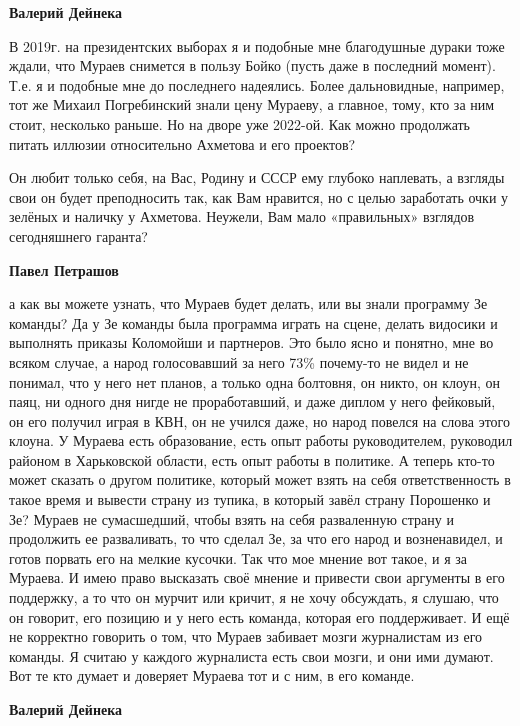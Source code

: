 \begin{itemize}
\begin{itemize}
\textbf{Валерий Дейнека} 

В 2019г. на президентских выборах я и подобные мне благодушные дураки тоже
ждали, что Мураев снимется в пользу Бойко (пусть даже в последний момент). Т.е.
я и подобные мне до последнего надеялись. Более дальновидные, например, тот же
Михаил Погребинский знали цену Мураеву, а главное, тому, кто за ним стоит,
несколько раньше. Но на дворе уже 2022-ой. Как можно продолжать питать иллюзии
относительно Ахметова и его проектов?


Он любит только себя, на Вас, Родину и СССР ему глубоко наплевать, а взгляды
свои он будет преподносить так, как Вам нравится, но с целью заработать очки у
зелёных и наличку у Ахметова. Неужели, Вам мало «правильных» взглядов
сегодняшнего гаранта?

\textbf{Павел Петрашов} 

а как вы можете узнать, что Мураев будет делать, или вы знали программу Зе
команды? Да у Зе команды была программа играть на сцене, делать видосики и
выполнять приказы Коломойши и партнеров. Это было ясно и понятно, мне во всяком
случае, а народ голосовавший за него 73\% почему-то не видел и не понимал, что
у него нет планов, а только одна болтовня, он никто, он клоун, он паяц, ни
одного дня нигде не проработавший, и даже диплом у него фейковый, он его
получил играя в КВН, он не учился даже, но народ повелся на слова этого клоуна.
У Мураева есть образование, есть опыт работы руководителем, руководил районом в
Харьковской области, есть опыт работы в политике. А теперь кто-то может сказать
о другом политике, который может взять на себя ответственность в такое время и
вывести страну из тупика, в который завёл страну Порошенко и Зе? Мураев не
сумасшедший, чтобы взять на себя разваленную страну и продолжить ее
разваливать, то что сделал Зе, за что его народ и возненавидел, и готов порвать
его на мелкие кусочки. Так что мое мнение вот такое, и я за Мураева. И имею
право высказать своё мнение и привести свои аргументы в его поддержку, а то что
он мурчит или кричит, я не хочу обсуждать, я слушаю, что он говорит, его
позицию и у него есть команда, которая его поддерживает. И ещё не корректно
говорить о том, что Мураев забивает мозги журналистам из его команды. Я считаю
у каждого журналиста есть свои мозги, и они ими думают. Вот те кто думает и
доверяет Мураева тот и с ним, в его команде.

\textbf{Валерий Дейнека}


\end{itemize}
\end{itemize}
